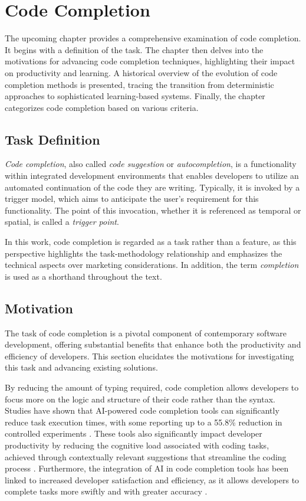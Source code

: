 \chapter{Code Completion}\label{chap:code-completion}

The upcoming chapter provides a comprehensive examination of code completion. It begins with a definition of the task. The chapter then delves into the motivations for advancing code completion techniques, highlighting their impact on productivity and learning. A historical overview of the evolution of code completion methods is presented, tracing the transition from deterministic approaches to sophisticated learning-based systems. Finally, the chapter categorizes code completion based on various criteria.

\section{Task Definition}

\textit{Code completion}, also called \textit{code suggestion} or \textit{autocompletion}, is a functionality within integrated development environments that enables developers to utilize an automated continuation of the code they are writing. Typically, it is invoked by a trigger model, which aims to anticipate the user's requirement for this functionality. The point of this invocation, whether it is referenced as temporal or spatial, is called a \textit{trigger point}.

In this work, code completion is regarded as a task rather than a feature, as this perspective highlights the task-methodology relationship and emphasizes the technical aspects over marketing considerations. In addition, the term \textit{completion} is used as a shorthand throughout the text.

\section{Motivation}

The task of code completion is a pivotal component of contemporary software development, offering substantial benefits that enhance both the productivity and efficiency of developers. This section elucidates the motivations for investigating this task and advancing existing solutions.

By reducing the amount of typing required, code completion allows developers to focus more on the logic and structure of their code rather than the syntax. Studies have shown that AI-powered code completion tools can significantly reduce task execution times, with some reporting up to a 55.8\% reduction in controlled experiments \parencite{peng2023}. These tools also significantly impact developer productivity by reducing the cognitive load associated with coding tasks, achieved through contextually relevant suggestions that streamline the coding process \parencite{weber2024}. Furthermore, the integration of AI in code completion tools has been linked to increased developer satisfaction and efficiency, as it allows developers to complete tasks more swiftly and with greater accuracy \parencite{bakal2025}.

